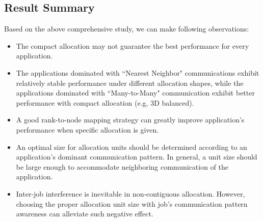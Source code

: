 \subsection{Result Summary}
\label{sec:summary}

Based on the above comprehensive study, we can make following observations:

\begin{itemize}

    \item The compact allocation may not guarantee the best performance for every application. 
    
    \item The applications dominated with ``Nearest Neighbor" communications exhibit 
    relatively stable performance under different allocation shapes, 
    while the applications dominated with ``Many-to-Many" communication exhibit 
    better performance with compact allocation (e.g, 3D balanced).
    
    \item A good rank-to-node mapping strategy can greatly improve 
    application's performance when specific allocation is given.
    
    \item An optimal size for allocation units should be determined 
    according to an application's dominant communication pattern. 
    In general, a unit size should be large enough to accommodate  
    neighboring communication of the application. 
    
    \item Inter-job interference is inevitable in non-contiguous allocation. 
    However, choosing the proper allocation unit size with job's communication 
    pattern awareness can alleviate such negative effect. 
    
\end{itemize}





